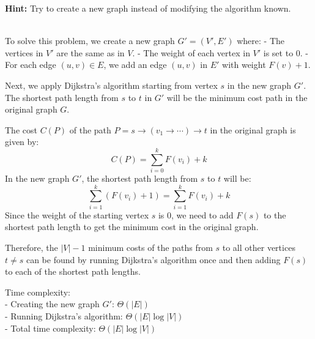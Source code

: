 \textbf{Hint:} Try to create a new graph instead of modifying the algorithm known.
\begin{solution} \\
    To solve this problem, we create a new graph $G'=(V',E')$ where:
    - The vertices in $V'$ are the same as in $V$.
    - The weight of each vertex in $V'$ is set to $0$.
    - For each edge $(u, v) \in E$, we add an edge $(u, v)$ in $E'$ with weight $F(v) + 1$.

    Next, we apply Dijkstra's algorithm starting from vertex $s$ in the new graph $G'$. The shortest path length from $s$ to $t$ in $G'$ will be the minimum cost path in the original graph $G$.

    The cost $C(P)$ of the path $P = s \to (v_1 \to \cdots ) \to t$ in the original graph is given by:
    \[
    C(P) = \sum_{i=0}^k F(v_i) + k
    \]
    In the new graph $G'$, the shortest path length from $s$ to $t$ will be:
    \[
    \sum_{i=1}^k (F(v_i) + 1) = \sum_{i=1}^k F(v_i) + k
    \]
    Since the weight of the starting vertex $s$ is $0$, we need to add $F(s)$ to the shortest path length to get the minimum cost in the original graph.

    Therefore, the $|V|-1$ minimum costs of the paths from $s$ to all other vertices $t \neq s$ can be found by running Dijkstra's algorithm once and then adding $F(s)$ to each of the shortest path lengths.

    Time complexity:\\
    - Creating the new graph $G'$: $\Theta(|E|)$\\
    - Running Dijkstra's algorithm: $\Theta(|E| \log |V|)$\\
    - Total time complexity: $\Theta(|E| \log |V|)$
\end{solution}